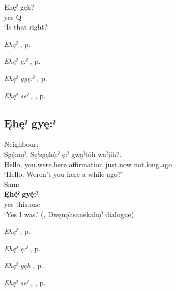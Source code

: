 \ea
\label{ex:enpart9}
\gll Ęhęˀ gęh?\\
yes Q\\
\glt ‘Is that right?
\z

\begin{CayugaRelated}
\item \textit{Ehęˀ} , p. \pageref{p:[ęhęˀ]}\\
\item \textit{Ehęˀ ę:ˀ} , p. \pageref{p:[ęhęˀ ę:ˀ]}\\
\item \textit{Ehęˀ gyę:ˀ} , p. \pageref{p:[ęhęˀ gyę:ˀ]}\\
\item \textit{Ehęˀ seˀ} , , p. \pageref{p:[ęhęˀ seˀ]}
\end{CayugaRelated}


\subsection*{\textbf{Ęhęˀ gyę:ˀ} } \label{p:[ęhęˀ gyę:ˀ]}

\ea
\label{ex:enpart10} Neighbour: \\
\gll Sgę́:nǫˀ. Se̱ˀsgęhę́:ˀ ę:ˀ gwa̱ˀtóh waˀjih?. \\
Hello, you.were.here affirmation just.now not.long.ago \\
\glt `Hello. Weren’t you here a while ago?’\\
Sam: \\
\gll \textbf{Ęhę́ˀ} \textbf{gyę́:ˀ}.\\
yes this.one\\
\glt  `Yes I was.’ (\cite[441]{mithun_watewayestanih_1984}, Dwęnǫhsanekahǫˀ dialogue)
\z

\begin{CayugaRelated}
\item \textit{Ehęˀ} , p. \pageref{p:[ęhęˀ]}\\
\item \textit{Ehęˀ ę:ˀ} , p. \pageref{p:[ęhęˀ ę:ˀ]}\\
\item \textit{Ehęˀ gęh} , p. \pageref{p:[ęhęˀ gęh]}\\
\item \textit{Ehęˀ seˀ} , , p. \pageref{p:[ęhęˀ seˀ]}
\end{CayugaRelated}


